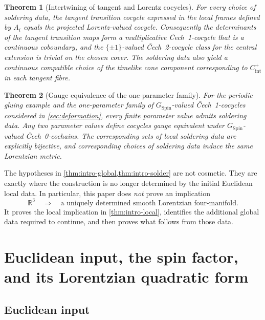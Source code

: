 \documentclass[11pt,a4paper]{article}
\newtheorem{theorem}{Theorem}[section]
\theoremstyle{definition}
\theoremstyle{remark}
\newcommand{\R}{\mathbb{R}}
\newcommand{\SpinG}{G_{\mathrm{Spin}}}
\newcommand{\Cech}{\ifmmode\text{\v{C}ech}\else\v{C}ech\fi}
\begin{document}
\begin{theorem}[Intertwining of tangent and Lorentz cocycles]
\label{thm:intro-compatibility}
For every choice of soldering data, the tangent transition cocycle expressed in the local frames defined by \(A_i\) equals the projected Lorentz-valued cocycle.  Consequently the determinants of the tangent transition maps form a multiplicative \Cech\ 1-cocycle that is a continuous coboundary, and the \(\{\pm1\}\)-valued \Cech\ 2-cocycle class for the central extension is trivial on the chosen cover.  The soldering data also yield a continuous compatible choice of the timelike cone component corresponding to \(C^{+}_{\mathrm{int}}\) in each tangent fibre.
\end{theorem}

\begin{theorem}[Gauge equivalence of the one-parameter family]
\label{thm:intro-deformation}
For the periodic gluing example and the one-parameter family of \(\SpinG\)-valued \Cech\ 1-cocycles considered in \cref{sec:deformation}, every finite parameter value
admits soldering data.  Any two parameter values define
cocycles gauge equivalent under \(\SpinG\)-valued \Cech\ 0-cochains.  The corresponding sets of local soldering data are explicitly bijective, and corresponding choices of soldering data induce the same
Lorentzian metric.
\end{theorem}

The hypotheses in \cref{thm:intro-global,thm:intro-solder} are not cosmetic.
They are exactly where the construction is no longer determined by the
initial Euclidean local data.  In particular, this paper does \emph{not}
prove an implication
\[
   \R^{3}\quad\Longrightarrow\quad\text{a uniquely determined smooth Lorentzian four-manifold}.
\]
It proves the local implication in \cref{thm:intro-local}, identifies the
additional global data required to continue, and then proves what follows
from those data.

\clearpage
\section{Euclidean input, the spin factor, and its Lorentzian quadratic form}
\label{sec:local}

\subsection{Euclidean input}
\end{document}
